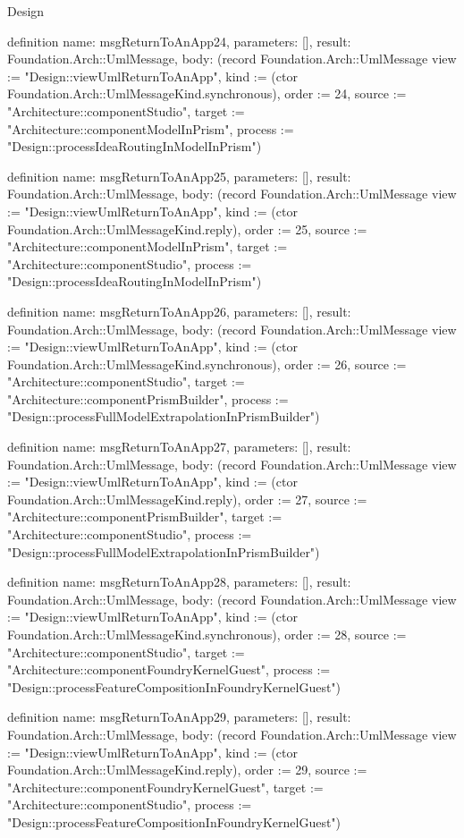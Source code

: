 \begin{lexlean}{Design}
\begin{semanticmodule}
definition{
  name: msgReturnToAnApp24,
  parameters: [],
  result: Foundation.Arch::UmlMessage,
  body: (record Foundation.Arch::UmlMessage {view := "Design::viewUmlReturnToAnApp", kind := (ctor Foundation.Arch::UmlMessageKind.synchronous), order := 24, source := "Architecture::componentStudio", target := "Architecture::componentModelInPrism", process := "Design::processIdeaRoutingInModelInPrism"})
}

definition{
  name: msgReturnToAnApp25,
  parameters: [],
  result: Foundation.Arch::UmlMessage,
  body: (record Foundation.Arch::UmlMessage {view := "Design::viewUmlReturnToAnApp", kind := (ctor Foundation.Arch::UmlMessageKind.reply), order := 25, source := "Architecture::componentModelInPrism", target := "Architecture::componentStudio", process := "Design::processIdeaRoutingInModelInPrism"})
}

definition{
  name: msgReturnToAnApp26,
  parameters: [],
  result: Foundation.Arch::UmlMessage,
  body: (record Foundation.Arch::UmlMessage {view := "Design::viewUmlReturnToAnApp", kind := (ctor Foundation.Arch::UmlMessageKind.synchronous), order := 26, source := "Architecture::componentStudio", target := "Architecture::componentPrismBuilder", process := "Design::processFullModelExtrapolationInPrismBuilder"})
}

definition{
  name: msgReturnToAnApp27,
  parameters: [],
  result: Foundation.Arch::UmlMessage,
  body: (record Foundation.Arch::UmlMessage {view := "Design::viewUmlReturnToAnApp", kind := (ctor Foundation.Arch::UmlMessageKind.reply), order := 27, source := "Architecture::componentPrismBuilder", target := "Architecture::componentStudio", process := "Design::processFullModelExtrapolationInPrismBuilder"})
}

definition{
  name: msgReturnToAnApp28,
  parameters: [],
  result: Foundation.Arch::UmlMessage,
  body: (record Foundation.Arch::UmlMessage {view := "Design::viewUmlReturnToAnApp", kind := (ctor Foundation.Arch::UmlMessageKind.synchronous), order := 28, source := "Architecture::componentStudio", target := "Architecture::componentFoundryKernelGuest", process := "Design::processFeatureCompositionInFoundryKernelGuest"})
}

definition{
  name: msgReturnToAnApp29,
  parameters: [],
  result: Foundation.Arch::UmlMessage,
  body: (record Foundation.Arch::UmlMessage {view := "Design::viewUmlReturnToAnApp", kind := (ctor Foundation.Arch::UmlMessageKind.reply), order := 29, source := "Architecture::componentFoundryKernelGuest", target := "Architecture::componentStudio", process := "Design::processFeatureCompositionInFoundryKernelGuest"})
}


\end{semanticmodule}
\end{lexlean}
